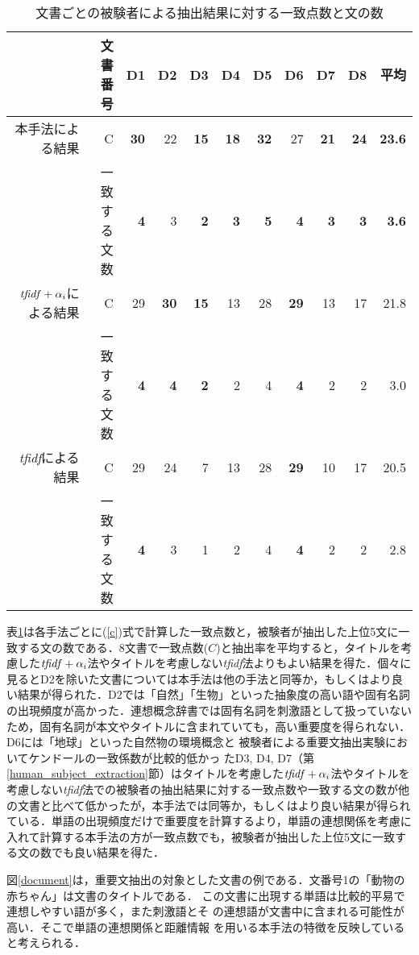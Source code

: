 \begin{table}[htb]
\begin{center}
\caption{文書ごとの被験者による抽出結果に対する一致点数と文の数}
\label{result}
\vspace*{1ex}
\label{c-all}
\begin{tabular}{|r|r||r|r|r|r|r|r|r|r||r|} \hline
&文書番号&D1&D2&D3&D4&D5&D6&D7&D8&平均\\ \hline 
{\small 本手法による結果}&C&{\bf30}&22&{\bf15}&{\bf18}&{\bf32}&27&{\bf21}&{\bf24}&{\bf23.6}\\ \cline{2-11}
&一致する文数& {\bf4}& 3& {\bf2}& {\bf3}& {\bf5}& {\bf4}& {\bf3}& {\bf3}&{\bf3.6}\\ \hline 
{\small ${\it tfidf}+\alpha_{i}$による結果}&C&29&{\bf30}&{\bf15}&13&28&{\bf29}&13&17&21.8\\ \cline{2-11}
&一致する文数&{\bf4}& {\bf4}&{\bf2}& 2& 4& {\bf4}& 2& 2&3.0\\ \hline 
{\small {\it tfidf}による結果}&C&  29&24&7&13&28&{\bf29}&10&17&20.5\\ \cline{2-11}
&一致する文数&{\bf4}& 3&1&2& 4& {\bf4}&2& 2&2.8\\ \hline
\end{tabular}
\end{center}
\end{table}

表\ref{c-all}は各手法ごとに(\ref{c})式で計算した一致点数と，被験者が抽出した上位5文に一致する文の数である．8文書で一致点数($C$)と抽出率を平均すると，タイトルを考慮した${\it tfidf}+\alpha_{i}$法やタイトルを考慮しない{\it tfidf}法よりもよい結果を得た．個々に見るとD2を除いた文書については本手法は他の手法と同等か，もしくはより良い結果が得られた．D2では「自然」「生物」といった抽象度の高い語や固有名詞の出現頻度が高かった．連想概念辞書では固有名詞を刺激語として扱っていないため，固有名詞が本文やタイトルに含まれていても，高い重要度を得られない．D6には「地球」といった自然物の環境概念と
被験者による重要文抽出実験においてケンドールの一致係数が比較的低かっ
たD3, D4, D7（第\ref{human_subject_extraction}節）はタイトルを考慮した${\it tfidf}+\alpha_{i}$法やタイトルを考慮しない{\it tfidf}法での被験者の抽出結果に対する一致点数や一致する文の数が他の文書と比べて低かったが，本手法では同等か，もしくはより良い結果が得られている．単語の出現頻度だけで重要度を計算するより，単語の連想関係を考慮に入れて計算する本手法の方が一致点数でも，被験者が抽出した上位5文に一致する文の数でも良い結果を得た．


図\ref{document}は，重要文抽出の対象とした文書の例である．文番号1の「動物の赤ちゃん」は文書のタイトルである．
この文書に出現する単語は比較的平易で連想しやすい語が多く，また刺激語とそ
の連想語が文書中に含まれる可能性が高い．そこで単語の連想関係と距離情報
を用いる本手法の特徴を反映していると考えられる．

